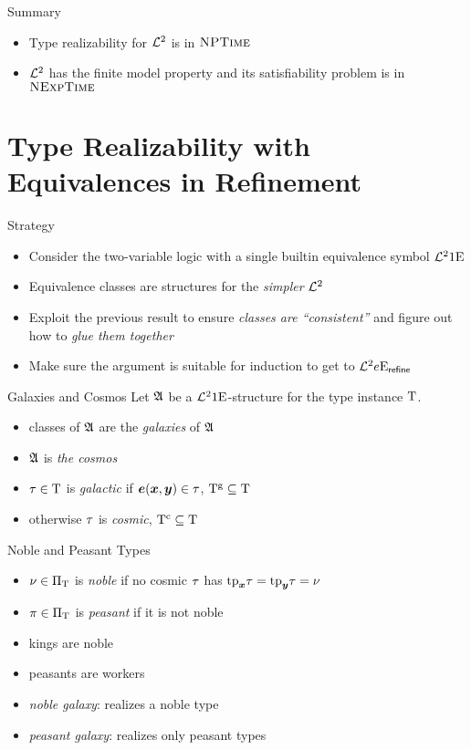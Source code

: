 \documentclass{beamer}
\begin{document}
\begin{frame}{Summary}
\begin{itemize}
  \item Type realizability for $\mathcal{L}^{2}$ is in $\text{\normalfont{\scshape NPTime}}$
  \item $\mathcal{L}^{2}$ has the finite model property and its satisfiability problem is
  in $\text{\normalfont{\scshape NExpTime}}$
\end{itemize}
\end{frame}

\section{Type Realizability with Equivalences in Refinement}
\begin{frame}{Strategy}
\begin{itemize}
  \item Consider the two-variable logic with a single builtin equivalence symbol
  $\mathcal{L}^{2}{1}\mathrm{E}_{{}}$
  \item Equivalence classes are structures for the \emph{simpler} $\mathcal{L}^{2}$
  \item Exploit the previous result to ensure \emph{classes are ``consistent''} and
  figure out how to
  \emph{glue them together}
  \item Make sure the argument is suitable for induction to get to
  $\mathcal{L}^{2}{e}\mathrm{E}_{\mathsf{refine}}$
\end{itemize}
\end{frame}

\begin{frame}{Galaxies and Cosmos}
Let $\mathfrak{A}$ be a $\mathcal{L}^{2}{1}\mathrm{E}_{{}}$-structure for the type instance $\mathrm{T}$.
\begin{itemize}
  \item classes of $\mathfrak{A}$ are the \emph{galaxies} of $\mathfrak{A}$
  \item $\mathfrak{A}$ is \emph{the cosmos}
  \item $\tau\in\mathrm{T}$ is \emph{galactic} if $\bm{e}(\bm{x},\bm{y})\in\tau$,
  $\mathrm{T}^{\mathrm{g}}\subseteq\mathrm{T}$
  \item otherwise $\tau$ is \emph{cosmic}, $\mathrm{T}^{\mathrm{c}}\subseteq\mathrm{T}$
\end{itemize}
\end{frame}

\begin{frame}{Noble and Peasant Types}
\begin{itemize}
  \item $\nu\in{\Pi}_{\mathrm{T}}$ is \emph{noble} if no cosmic $\tau$ has
  $\mathrm{tp}_{\bm{x}}\tau = \mathrm{tp}_{\bm{y}}\tau = \nu$
  \item $\pi\in{\Pi}_{\mathrm{T}}$ is \emph{peasant} if it is not noble
  \item kings are noble
  \item peasants are workers
  \item \emph{noble galaxy}: realizes a noble type
  \item \emph{peasant galaxy}: realizes only peasant types
\end{itemize}
\end{frame}
\end{document}
